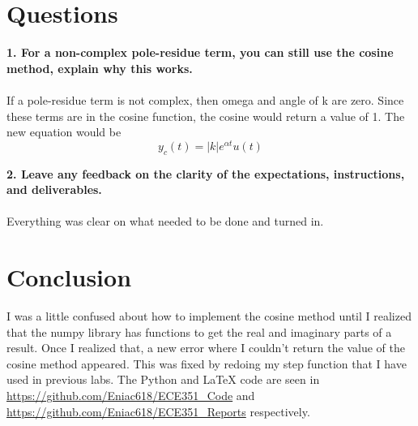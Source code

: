 \documentclass[12pt]{report}
\begin{document}
\section{Questions}
\textbf{1. For a non-complex pole-residue term, you can still use the cosine method, explain why this
works.} \\ \\
If a pole-residue term is not complex, then omega and angle of k are zero. Since these terms are in the cosine function, the cosine would return a value of 1. The new equation would be $$ y_c(t) = |k|e^{\alpha t}u(t) $$

\textbf{2. Leave any feedback on the clarity of the expectations, instructions, and deliverables.} \\ \\
Everything was clear on what needed to be done and turned in.

\section{Conclusion}
I was a little confused about how to implement the cosine method until I realized that the numpy library has functions to get the real and imaginary parts of a result. Once I realized that, a new error where I couldn't return the value of the cosine method appeared. This was fixed by redoing my step function that I have used in previous labs. The Python and \LaTeX{} code are seen in \url{https://github.com/Eniac618/ECE351_Code} and \url{https://github.com/Eniac618/ECE351_Reports} respectively.
\end{document}
